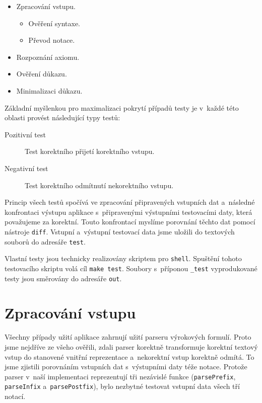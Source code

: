 \documentclass[thesis=B,czech,hidelinks]{thesis}[2012/06/26]
\begin{document}
\begin{itemize}
	\item Zpracování vstupu.
	\begin{itemize}
		\item Ověření syntaxe.
		\item Převod notace.
	\end{itemize}
	\item Rozpoznání axiomu.
	\item Ověření důkazu.
	\item Minimalizaci důkazu.
\end{itemize}

Základní myšlenkou pro maximalizaci pokrytí případů testy je v~každé této oblasti provést následující typy testů:

\begin{description}
	\item[Pozitivní test] Test korektního přijetí korektního vstupu.
	\item[Negativní test] Test korektního odmítnutí nekorektního vstupu.
\end{description}

Princip všech testů spočívá ve zpracování připravených vstupních dat a~následné konfrontaci výstupu aplikace s~připravenými výstupními testovacími daty, která považujeme za korektní. Touto konfrontací myslíme porovnání těchto dat pomocí nástroje \texttt{diff}. Vstupní a~výstupní testovací data jsme uložili do textových souborů do adresáře \texttt{test}.

Vlastní testy jsou technicky realizovány skriptem pro \texttt{shell}. Spuštění tohoto testovacího skriptu volá cíl \texttt{make test}. Soubory s~příponou \texttt{\_test} vyprodukované testy jsou směrovány do adresáře \texttt{out}.

\section{Zpracování vstupu}

Všechny případy užití aplikace zahrnují užití parseru výrokových formulí. Proto jsme nejdříve ze všeho ověřili, zdali parser korektně transformuje korektní textový vstup do stanovené vnitřní reprezentace a~nekorektní vstup korektně odmítá. To jsme zjistili porovnáním vstupních dat s~výstupními daty téže notace. Protože parser v~naší implementaci reprezentují tři nezávislé funkce (\texttt{parsePrefix}, \texttt{parseInfix} a~\texttt{parsePostfix}), bylo nezbytné testovat vstupní data všech tří notací. 
\end{document}
